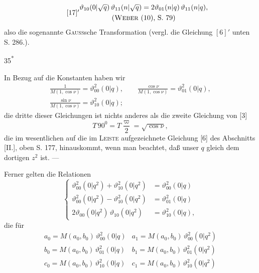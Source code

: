 \begin{equation*}\tag*{$[17]'$}\begin{gathered}
\vartheta_{10}(0|\sqrt q)\,\vartheta_{11}(n|\sqrt q)=2\vartheta_{01}(n|q)\,\vartheta_{11}(n|q),\\
\text{(\textsc{Weber} (10), S. 79)}
\end{gathered}\end{equation*}
\noindent also die sogenannte \textsc{Gauss}sche Transformation (vergl. die Gleichung $[6]'$ unten S. 286.).
\par\smallskip\hfill35\textsuperscript{*}\par
\clearpage
{}
\par\indent In Bezug auf die Konstanten haben wir
\begin{equation*}\tag*{$(\alpha)$}\begin{gathered}
\frac1{M(1,\cos\nu)}=\vartheta_{00}^2(0|q),\qquad\frac{\cos\nu}{M(1,\cos\nu)}=\vartheta_{01}^2(0|q),\\
\frac{\sin\nu}{M(1,\cos\nu)}=\vartheta_{10}^2(0|q);
\end{gathered}\end{equation*}
\noindent die dritte dieser Gleichungen ist nichts anderes als die zweite Gleichung von [3]
\[T\,90^0=T\frac\varpi2=\sqrt{\cos\nu},\]
\noindent die im wesentlichen auf die im \textsc{Leiste} aufgezeichnete Gleichung [6] des Abschnitts [II.], oben S. 177, hinauskommt, wenn man beachtet, daß unser $q$ gleich dem dortigen $z^2$ ist. —
\par\indent Ferner gelten die Relationen
\begin{equation*}\tag*{$(\beta)$}\left\{\begin{aligned}
\vartheta_{00}^2(0|q^2)+\vartheta_{10}^2(0|q^2)&=\vartheta_{00}^2(0|q)\\
\vartheta_{00}^2(0|q^2)-\vartheta_{10}^2(0|q^2)&=\vartheta_{01}^2(0|q)\\
2\vartheta_{00}(0|q^2)\,\vartheta_{10}(0|q^2)&=\vartheta_{10}^2(0|q),
\end{aligned}\right.\end{equation*}
\noindent die für
\[\begin{array}{l|l}
a_0=M(a_0,b_0)\,\vartheta_{00}^2(0|q)&a_1=M(a_0,b_0)\,\vartheta_{00}^2(0|q^2)\\
b_0=M(a_0,b_0)\,\vartheta_{01}^2(0|q)&b_1=M(a_0,b_0)\,\vartheta_{01}^2(0|q^2)\\
c_0=M(a_0,b_0)\,\vartheta_{10}^2(0|q)&c_1=M(a_0,b_0)\,\vartheta_{10}^2(0|q^2)
\end{array}\]
